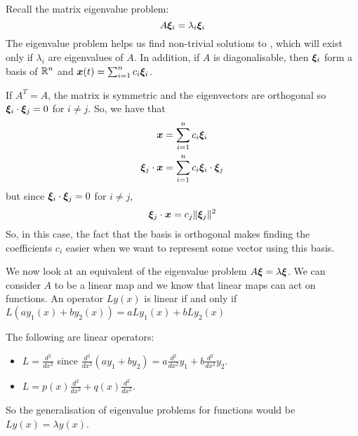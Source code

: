 Recall the matrix eigenvalue problem: 
\begin{equation}\label{eq4.1}
	A \bm{\xi}_i = \lambda_i \bm{\xi}_i
\end{equation}
The eigenvalue problem helps us find non-trivial solutions to , which will exist only if $\lambda_i$ are eigenvalues of $A$. In addition, if $A$ is diagonalisable, then $\bm{\xi}_i$ form a basis of $\mathbb{R}^n$ and $\bm{x}(t) = \sum_{i=1}^n c_i \bm{\xi}_i$.

If $A^T = A$, the matrix is symmetric and the eigenvectors are orthogonal so $\bm{\xi}_i \cdot \bm{\xi}_j = 0$ for $i \neq j$. So, we have that
\begin{align*}
	\bm{x} &= \sum_{i=1}^n c_i \bm{\xi}_i \\
	\bm{\xi}_j \cdot \bm{x} &= \sum_{i=1}^n c_i \bm{\xi}_i \cdot \bm{\xi}_j
\end{align*}
but since $\bm{\xi}_i \cdot \bm{\xi}_j = 0$ for $i \neq j$, 
\begin{align*}
	\bm{\xi}_j \cdot \bm{x} = c_j \Vert \bm{\xi}_j \Vert^2
\end{align*}
So, in this case, the fact that the basis is orthogonal makes finding the coefficients $c_i$ easier when we want to represent some vector using this basis.


We now look at an equivalent of the eigenvalue problem $A \bm{\xi} = \lambda \bm{\xi}$. We can consider $A$ to be a linear map and we know that linear maps can act on functions. An operator $Ly(x)$ is linear if and only if $L(ay_1(x) + by_2(x)) = aLy_1(x) + bLy_2(x)$

\begin{eg}\label{eg:linearmap}
	The following are linear operators:
	\begin{itemize}
		\item $L = \frac{d^2}{dx^2}$ since $\frac{d^2}{dx^2}(ay_1 + by_2) = a \frac{d^2}{dx^2}y_1 + b \frac{d^2}{dx^2}y_2$.
		\item $L = p(x)\frac{d^2}{dx^2} + q(x)\frac{d^2}{dx^2}$.
	\end{itemize}
\end{eg}

So the generalisation of eigenvalue problems for functions would be $Ly(x) = \lambda y(x)$.

